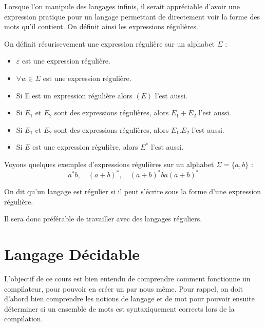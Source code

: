Lorsque l'on manipule des langages infinis, il serait appréciable d'avoir une expression pratique pour un langage 
permettant de directement voir la forme des mots qu'il contient. On définit ainsi les expressions régulières. 

\begin{definition}
    On définit récurisevement une expression régulière sur un alphabet $\Sigma$ :
    \begin{itemize}
        \item $\varepsilon$ est une expression régulière. 
        \item $ \forall w \in \Sigma$ est une expression régulière. 
        \item Si E est un expression régulière alors $(E)$ l'est aussi. 
        \item Si $E_1$ et $E_2$ sont des expressions régulières, alors $E_1 + E_2$ l'est aussi. 
        \item Si $E_1$ et $E_2$ sont des expressions régulières, alors $E_1.E_2$ l'est aussi.
        \item Si $E$ est une expression régulière, alors $E^*$ l'est aussi. 
    \end{itemize}
\end{definition}

\begin{example}
    Voyons quelques exemples d'expressions régulières sur un alphabet $\Sigma = \{a,b\}$ :
    \[ a^*b, \quad (a+b)^*, \quad (a+b)^*ba(a+b)^* \] 
\end{example}

\begin{definition}
    On dit qu'un langage est régulier si il peut s'écrire sous la forme d'une expression régulière. 
\end{definition}

Il sera donc préférable de travailler avec des langages réguliers. 


\section{Langage Décidable}

L'objectif de ce cours est bien entendu de comprendre comment fonctionne un compilateur, pour pouvoir en créer un par nous même. 
Pour rappel, on doit d'abord bien comprendre les notions de langage et de mot pour pouvoir ensuite déterminer si un ensemble de 
mots est syntaxiquement corrects lors de la compilation. 

